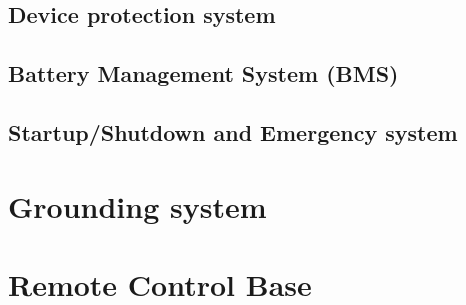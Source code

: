 \subsection{Device protection system}
\subsection{Battery Management System (BMS)}
\subsection{Startup/Shutdown and Emergency system}
\section{Grounding system}
\section{Remote Control Base} \label{REMOTECONTROLBASE}


